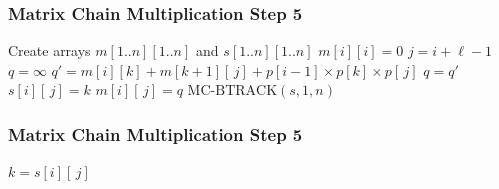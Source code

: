 \documentclass{beamer}
\begin{document}
\begin{frame} \frametitle{Matrix Chain Multiplication Step 5}
  {\scriptsize
  \begin{algorithmic}[1]
    \State Create arrays $m[1..n][1..n]$ and $s[1..n][1..n]$
      \State $m[i][i] = 0$ 
    \EndFor
     
        \State $j = i + \ell - 1$
        \State $q=\infty$
          \State $q' = m[i][k] + m[k+1][\,j] + p[i-1] \times p[k] \times p[\,j]$
            \State $q = q'$
            \State $s[i][\, j] = k$
          \EndIf
        \EndFor
        \State $m[i][\,j] = q$
      \EndFor
    \EndFor
    \State \Return $\text{MC-BTRACK}(s, 1, n)$
    \EndFunction
  \end{algorithmic}
  }
\end{frame}

\begin{frame} \frametitle{Matrix Chain Multiplication Step 5}
  {\scriptsize
  \begin{algorithmic}[1]
     
      \State {}
    \EndIf
    \State $k = s[i][\, j]$
    \State {}
    \EndFunction
  \end{algorithmic}
  }
\end{frame}
\end{document}
